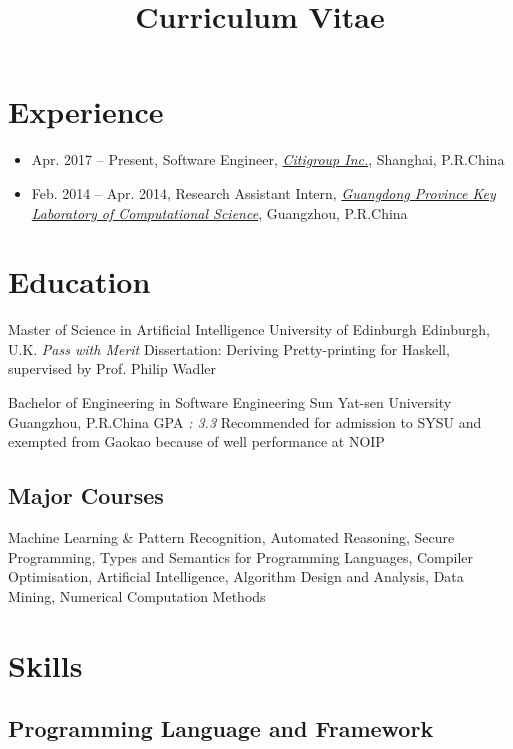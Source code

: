 \documentclass[11pt,a4paper,sans]{moderncv}
\title{Curriculum Vitae}
\newcommand\Colorhref[3][blue]{\href{#2}{\small\color{#1}#3}}
\begin{document}
\makecvtitle

\section{Experience}
\begin{itemize}
	\item Apr. 2017 -- Present, Software Engineer, \Colorhref[blue]{http://www.citigroup.com/china/csts/}{\textit{Citigroup Inc.}}, Shanghai, P.R.China
	\item Feb. 2014 -- Apr. 2014, Research Assistant Intern, \Colorhref[blue]{http://www.compsci.sysu.edu.cn/cn/cn01/index.htm}{\textit{Guangdong Province Key Laboratory of Computational Science}}, Guangzhou, P.R.China
\end{itemize}

\section{Education}
{Master of Science in Artificial Intelligence}
{University of Edinburgh}
{Edinburgh, U.K.}
{\textit{Pass with Merit}}
{Dissertation: Deriving Pretty-printing for Haskell, supervised by Prof. Philip Wadler}

{Bachelor of Engineering in Software Engineering}
{Sun Yat-sen University}
{Guangzhou, P.R.China}
{GPA \textit{: 3.3}}
{Recommended for admission to SYSU and exempted from Gaokao because of well performance at NOIP}

\subsection{Major Courses}
{\small Machine Learning \& Pattern Recognition, Automated Reasoning,  Secure Programming,  Types and Semantics for Programming Languages, Compiler Optimisation, Artificial Intelligence, Algorithm Design and Analysis, Data Mining, Numerical Computation Methods}

\section{Skills}
\subsection{Programming Language and Framework}
\end{document}
